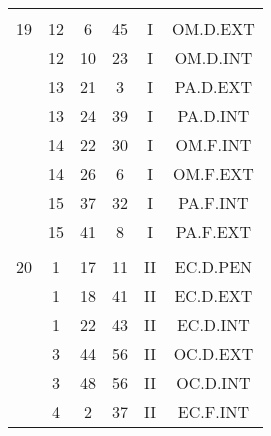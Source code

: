 \documentclass[12pt, a4paper]{article}
\begin{document}
\begin{multicols}{3}
{\begin{tabular}{c c c c c c}
	 	 	 	 & & & & & \\%
	 	 	 	19 & 12 & 6 & 45 & I & OM.D.EXT\\%
	 	 	 	 & 12 & 10 & 23 & I & OM.D.INT\\%
	 	 	 	 & 13 & 21 & 3 & I & PA.D.EXT\\%
	 	 	 	 & 13 & 24 & 39 & I & PA.D.INT\\%
	 	 	 	 & 14 & 22 & 30 & I & OM.F.INT\\%
	 	 	 	 & 14 & 26 & 6 & I & OM.F.EXT\\%
	 	 	 	 & 15 & 37 & 32 & I & PA.F.INT\\%
	 	 	 	 & 15 & 41 & 8 & I & PA.F.EXT\\%
	 	 	 	 & & & & & \\%
	 	 	 	20 & 1 & 17 & 11 & II & EC.D.PEN\\%
	 	 	 	 & 1 & 18 & 41 & II & EC.D.EXT\\%
	 	 	 	 & 1 & 22 & 43 & II & EC.D.INT\\%
	 	 	 	 & 3 & 44 & 56 & II & OC.D.EXT\\%
	 	 	 	 & 3 & 48 & 56 & II & OC.D.INT\\%
	 	 	 	 & 4 & 2 & 37 & II & EC.F.INT\\%
	 	 \end{tabular}
 	}
\end{multicols}
\end{document}
